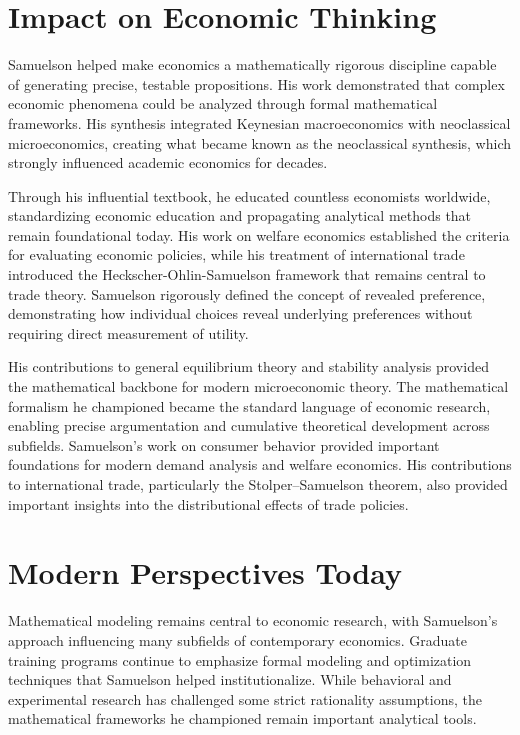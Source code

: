 \section{Impact on Economic Thinking}
Samuelson helped make economics a mathematically rigorous discipline capable of generating precise,
testable propositions. His work demonstrated that complex economic phenomena could be analyzed
through formal mathematical frameworks. His synthesis integrated Keynesian macroeconomics with
neoclassical microeconomics, creating what became known as the neoclassical synthesis, which
strongly influenced academic economics for decades.

Through his influential textbook, he educated countless economists worldwide, standardizing
economic education and propagating analytical methods that remain foundational today. His work
on welfare economics established the criteria for evaluating economic policies, while his
treatment of international trade introduced the Heckscher-Ohlin-Samuelson framework that remains
central to trade theory. Samuelson rigorously defined the concept of revealed preference,
demonstrating how individual choices reveal underlying preferences without requiring direct
measurement of utility.

His contributions to general equilibrium theory and stability analysis provided the mathematical
backbone for modern microeconomic theory. The mathematical formalism he championed became the
standard language of economic research, enabling precise argumentation and cumulative theoretical
development across subfields. Samuelson's work on consumer behavior provided important foundations
for modern demand analysis and welfare economics. His contributions to international trade,
particularly the Stolper--Samuelson theorem, also provided important insights into the
distributional effects of trade policies.

\section{Modern Perspectives Today}
Mathematical modeling remains central to economic research, with Samuelson's approach influencing
many subfields of contemporary economics. Graduate training programs continue to emphasize formal
modeling and optimization techniques that Samuelson helped institutionalize. While behavioral and
experimental research has challenged some strict rationality assumptions, the mathematical
frameworks he championed remain important analytical tools.

